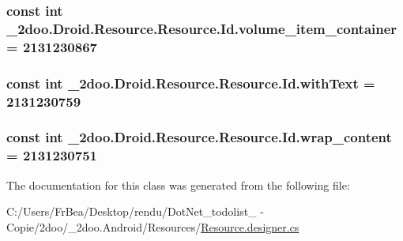 \hypertarget{class__2doo_1_1_droid_1_1_resource_1_1_id_54b1cd09685865f4e856a9f21af509d6}{
\subsubsection[{volume\_\-item\_\-container}]{\setlength{\rightskip}{0pt plus 5cm}const int \_\-2doo.Droid.Resource.Resource.Id.volume\_\-item\_\-container = 2131230867}}
\label{class__2doo_1_1_droid_1_1_resource_1_1_id_54b1cd09685865f4e856a9f21af509d6}


\hypertarget{class__2doo_1_1_droid_1_1_resource_1_1_id_e1c5bda7a7a2f08966f48ff8e842e231}{
\subsubsection[{withText}]{\setlength{\rightskip}{0pt plus 5cm}const int \_\-2doo.Droid.Resource.Resource.Id.withText = 2131230759}}
\label{class__2doo_1_1_droid_1_1_resource_1_1_id_e1c5bda7a7a2f08966f48ff8e842e231}


\hypertarget{class__2doo_1_1_droid_1_1_resource_1_1_id_e9c511a647597d2c27a6e4074a283736}{
\subsubsection[{wrap\_\-content}]{\setlength{\rightskip}{0pt plus 5cm}const int \_\-2doo.Droid.Resource.Resource.Id.wrap\_\-content = 2131230751}}
\label{class__2doo_1_1_droid_1_1_resource_1_1_id_e9c511a647597d2c27a6e4074a283736}




The documentation for this class was generated from the following file:\begin{CompactItemize}
\item 
C:/Users/FrBea/Desktop/rendu/DotNet\_\-todolist\_ - Copie/2doo/\_\-2doo.Android/Resources/\hyperlink{_resource_8designer_8cs}{Resource.designer.cs}\end{CompactItemize}
